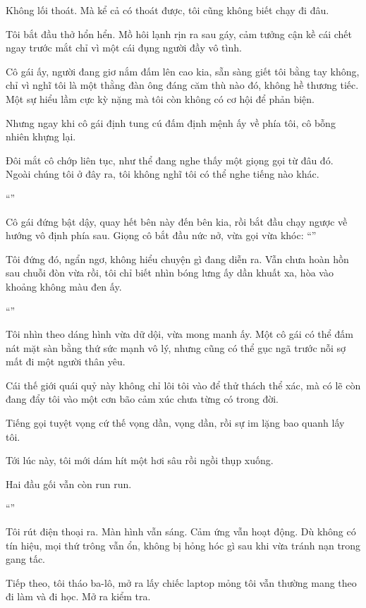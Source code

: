 \documentclass[../main.tex]{subfiles}
\begin{document}
Không lối thoát. Mà kể cả có thoát được, tôi cũng không biết chạy đi đâu.

Tôi bắt đầu thở hổn hển. Mồ hôi lạnh rịn ra sau gáy, cảm tưởng cận kề cái chết ngay trước mắt chỉ vì một cái đụng người đầy vô tình.

Cô gái ấy, người đang giơ nắm đấm lên cao kia, sẵn sàng giết tôi bằng tay không, chỉ vì nghĩ tôi là một thằng đàn ông đáng căm thù nào đó, không hề thương tiếc. Một sự hiểu lầm cực kỳ nặng mà tôi còn không có cơ hội để phản biện.

Nhưng ngay khi cô gái định tung cú đấm định mệnh ấy về phía tôi, cô bỗng nhiên khựng lại.

Đôi mắt cô chớp liên tục, như thể đang nghe thấy một giọng gọi từ đâu đó. Ngoài chúng tôi ở đây ra, tôi không nghĩ tôi có thể nghe tiếng nào khác.

``''

Cô gái đứng bật dậy, quay hết bên này đến bên kia, rồi bắt đầu chạy ngược về hướng vô định phía sau. Giọng cô bắt đầu nức nở, vừa gọi vừa khóc: ``''

Tôi đứng đó, ngẩn ngơ, không hiểu chuyện gì đang diễn ra. Vẫn chưa hoàn hồn sau chuỗi đòn vừa rồi, tôi chỉ biết nhìn bóng lưng ấy dần khuất xa, hòa vào khoảng không màu đen ấy.

``\textit{}''

Tôi nhìn theo dáng hình vừa dữ dội, vừa mong manh ấy. Một cô gái có thể đấm nát mặt sàn bằng thứ sức mạnh vô lý, nhưng cũng có thể gục ngã trước nỗi sợ mất đi một người thân yêu.

Cái thế giới quái quỷ này không chỉ lôi tôi vào để thử thách thể xác, mà có lẽ còn đang đẩy tôi vào một cơn bão cảm xúc chưa từng có trong đời.

Tiếng gọi tuyệt vọng cứ thế vọng dần, vọng dần, rồi sự im lặng bao quanh lấy tôi.

Tới lúc này, tôi mới dám hít một hơi sâu rồi ngồi thụp xuống.

Hai đầu gối vẫn còn run run.

``''

Tôi rút điện thoại ra. Màn hình vẫn sáng. Cảm ứng vẫn hoạt động. Dù không có tín hiệu, mọi thứ trông vẫn ổn, không bị hỏng hóc gì sau khi vừa tránh nạn trong gang tấc.

Tiếp theo, tôi tháo ba-lô, mở ra lấy chiếc laptop mỏng tôi vẫn thường mang theo đi làm và đi học. Mở ra kiểm tra.
\end{document}
